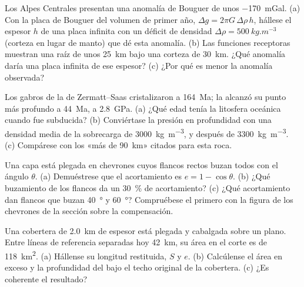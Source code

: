 \begin{exercise}[$\star\star$]\label{exo:b2:alpine-orogen:5}
Los Alpes Centrales presentan una anomalía de Bouguer de unos \qty{-170}{mGal}. (a) Con la placa
de Bouguer del volumen de primer año, $\Delta g = 2\pi G\,\Delta\rho\,h$, hállese el espesor $h$ de una
placa infinita con un déficit de densidad $\Delta\rho = \qty{500}{kg.m^{-3}}$ (corteza en lugar de manto)
que dé esta anomalía. (b) Las funciones receptoras muestran una raíz de unos \qty{25}{km} bajo una
corteza de \qty{30}{km}. ¿Qué anomalía daría una placa infinita de ese espesor? (c) ¿Por qué es menor la
anomalía observada?
\end{exercise}

\begin{exercise}[$\star\star$]\label{exo:b2:alpine-orogen:6}
Los gabros de la  de Zermatt--Saas cristalizaron a \qty{164}{Ma}; la  alcanzó
su punto más profundo a \qty{44}{Ma}, a \qty{2.8}{GPa}. (a) ¿Qué edad tenía la litosfera
oceánica cuando fue subducida? (b) Conviértase la presión en profundidad con una densidad media
de la sobrecarga de \qty{3000}{kg.m^{-3}}, y después de \qty{3300}{kg.m^{-3}}. (c) Compárese con los
«más de \qty{90}{km}» citados para esta roca.
\end{exercise}

\begin{exercise}[$\star\star$]\label{exo:b2:alpine-orogen:7}
Una capa está plegada en chevrones cuyos flancos rectos buzan todos con el ángulo $\theta$.
(a) Demuéstrese que el acortamiento es $e = 1 - \cos\theta$. (b) ¿Qué buzamiento de los flancos da un
\qty{30}{\percent} de acortamiento? (c) ¿Qué acortamiento dan flancos que buzan \qty{40}{\degree} y
\qty{60}{\degree}? Compruébese el primero con la figura de los chevrones de la sección sobre la compensación.
\end{exercise}

\begin{exercise}[$\star\star$]\label{exo:b2:alpine-orogen:8}
Una cobertera de \qty{2.0}{km} de espesor está plegada y cabalgada sobre un  plano. Entre líneas de referencia
separadas hoy \qty{42}{km}, su área en el corte es de \qty{118}{km^2}. (a) Hállense su longitud
restituida, $S$ y $e$. (b) Calcúlense el área en exceso y la profundidad del  bajo el
techo original de la cobertera. (c) ¿Es coherente el resultado?
\end{exercise}

